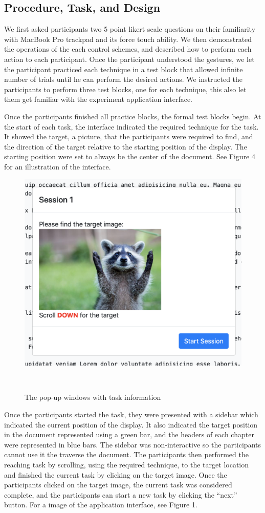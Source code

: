 \documentclass{sigchi}
\begin{document}
\subsection{Procedure, Task, and Design}
We first asked participants two 5 point likert scale questions on their familiarity with MacBook Pro trackpad and its force touch ability. We then demonstrated the operations of the each control schemes, and described how to perform each action to each participant. Once the participant understood the gestures, we let the participant practiced each technique in a test block that allowed infinite number of trials until he can perform the desired actions. We instructed the participants to perform three test blocks, one for each technique, this also let them get familiar with the experiment application interface.

Once the participants finished all practice blocks, the formal test blocks begin. At the start of each task, the interface indicated the required technique for the task. It showed the target, a picture, that the participants were required to find, and the direction of the target relative to the starting position of the display. The starting position were set to always be the center of the document. See Figure 4 for an illustration of the interface.

\begin{figure}[!h]
	\centering
	\includegraphics[width=0.7\columnwidth]{figures/figure3}
	\caption{The pop-up windows with task information}~\label{fig:figure4}
\end{figure}

Once the participants started the task, they were presented with a sidebar which indicated the current position of the display. It also indicated the target position in the document represented using a green bar, and the headers of each chapter were represented in blue bars. The sidebar was non-interactive so the participants cannot use it the traverse the document. The participants then performed the reaching task by scrolling, using the required technique, to the target location and finished the current task by clicking on the target image. Once the participants clicked on the target image, the current task was considered complete, and the participants can start a new task by clicking the ``next'' button. For a image of the application interface, see Figure 1.
\end{document}
